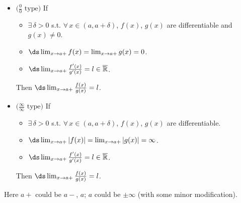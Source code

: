 \begin{theorem}\label{thm:APPlhopital}
\begin{itemize}
\item $\big(\frac{0}{0}\text{ type}\big)$ If
\begin{itemize}
\item $\exists\,\delta > 0$ s.t. $\forall\,x\in(a, a + \delta)$, $f(x)$, $g(x)$ are differentiable and $g(x)\ne 0$.
\item $\ds\lim_{x\to a+}f(x) = \lim_{x\to a+}g(x) = 0$.
\item $\ds\lim_{x\to a+}\frac{f'(x)}{g'(x)} = l\in\overline{\mathbb{R}}$.
\end{itemize}
Then $\ds\lim_{x\to a+}\frac{f(x)}{g(x)} = l$.
\item $\big(\frac{\infty}{\infty}\text{ type}\big)$ If
\begin{itemize}
\item $\exists\,\delta > 0$ s.t. $\forall\,x\in(a, a + \delta)$, $f(x)$, $g(x)$ are differentiable.
\item $\ds\lim_{x\to a+}|f(x)| = \lim_{x\to a+}|g(x)| = \infty$.
\item $\ds\lim_{x\to a+}\frac{f'(x)}{g'(x)} = l\in\overline{\mathbb{R}}$.
\end{itemize}
Then $\ds\lim_{x\to a+}\frac{f(x)}{g(x)} = l$.
\end{itemize}
Here $a+$ could be $a-$, $a$; $a$ could be $\pm\infty$ (with some minor modification).
\end{theorem}
